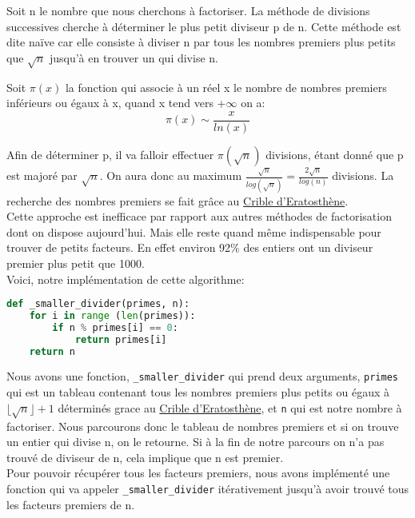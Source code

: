Soit n le nombre que nous cherchons à factoriser.
La méthode de divisions successives cherche à déterminer le plus petit diviseur p de n.
Cette méthode est dite naïve car elle consiste à diviser n par tous les nombres premiers plus petits que $\sqrt{n}$ jusqu'à en trouver un qui divise n.

\begin{theorem}
\label{Theoerme des nombre premier}
    Soit $\pi(x)$ la fonction qui associe à un réel x le nombre de nombres premiers inférieurs ou égaux à x, quand x tend vers +$\infty$ on a:
    \[\pi(x) \sim \frac{x}{ln(x)}\]
\end{theorem}

Afin de déterminer p, il va falloir effectuer $\pi(\sqrt{n})$ divisions, étant donné que p est majoré par $\sqrt{n}$. On aura donc au maximum $\frac{\sqrt{n}}{log(\sqrt{n})} = \frac{2\sqrt{n}}{log(n)}$ divisions.
La recherche des nombres premiers se fait grâce au \hyperref[Eratosthène]{Crible d'Eratosthène}. \\

Cette approche est inefficace par rapport aux autres méthodes de factorisation dont on dispose aujourd’hui. 
Mais elle reste quand même indispensable pour trouver de petits facteurs. En effet environ 92\% des entiers ont un diviseur premier plus petit que 1000. \\

Voici, notre implémentation de cette algorithme:
\begin{lstlisting}[language=Python]
def _smaller_divider(primes, n):
    for i in range (len(primes)):
        if n % primes[i] == 0:
            return primes[i]
    return n
\end{lstlisting}
\vspace{1em}

Nous avons une fonction, \lstinline{_smaller_divider} qui prend deux arguments, \lstinline{primes} qui est un tableau contenant tous les nombres premiers plus petits ou égaux à $\lfloor \sqrt{n} \rfloor + 1$ déterminés grace au \hyperref[Eratosthène]{Crible d'Eratosthène}, et \lstinline{n} qui est notre nombre à factoriser.
Nous parcourons donc le tableau de nombres premiers et si on trouve un entier qui divise n, on le retourne. Si à la fin de notre parcours on n'a pas trouvé de diviseur de n, cela implique que n est premier. \\

Pour pouvoir récupérer tous les facteurs premiers, nous avons implémenté une fonction qui va appeler \lstinline{_smaller_divider} itérativement jusqu'à avoir trouvé tous les facteurs premiers de n.

